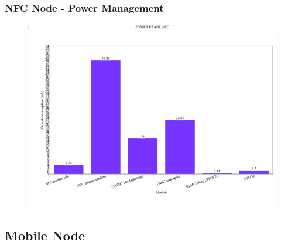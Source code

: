 \begin{frame}[fragile]
\frametitle{NFC Node - Power Management} 
\begin{figure}
  \centering
	\includegraphics[width=\textwidth]{images/NFC15.png}
\end{figure}
\end{frame}


\subsection{Mobile Node}

